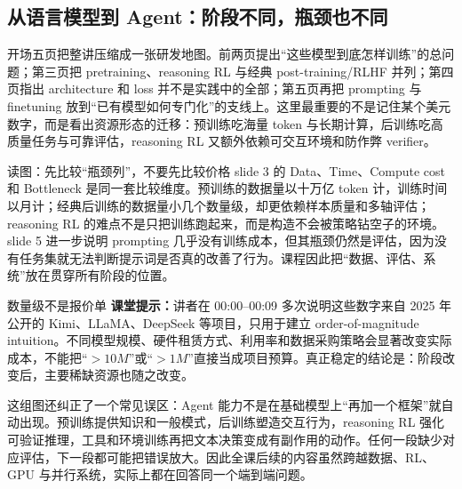 \subsection{从语言模型到 Agent：阶段不同，瓶颈也不同}

开场五页把整讲压缩成一张研发地图。前两页提出“这些模型到底怎样训练”的总问题；第三页把 pretraining、reasoning RL 与经典 post-training/RLHF 并列；第四页指出 architecture 和 loss 并不是实践中的全部；第五页再把 prompting 与 finetuning 放到“已有模型如何专门化”的支线上。这里最重要的不是记住某个美元数字，而是看出资源形态的迁移：预训练吃海量 token 与长期计算，后训练吃高质量任务与可靠评估，reasoning RL 又额外依赖可交互环境和防作弊 verifier。


\begin{knowledgebox}{读图：先比较“瓶颈列”，不要先比较价格}
slide 3 的 Data、Time、Compute cost 和 Bottleneck 是同一套比较维度。预训练的数据量以十万亿 token 计，训练时间以月计；经典后训练的数据量小几个数量级，却更依赖样本质量和多轴评估；reasoning RL 的难点不是只把训练跑起来，而是构造不会被策略钻空子的环境。slide 5 进一步说明 prompting 几乎没有训练成本，但其瓶颈仍然是评估，因为没有任务集就无法判断提示词是否真的改善了行为。课程因此把“数据、评估、系统”放在贯穿所有阶段的位置。
\end{knowledgebox}

\begin{warningbox}{数量级不是报价单}
\textbf{课堂提示：}讲者在 00:00--00:09 多次说明这些数字来自 2025 年公开的 Kimi、LLaMA、DeepSeek 等项目，只用于建立 order-of-magnitude intuition。不同模型规模、硬件租赁方式、利用率和数据采购策略会显著改变实际成本，不能把“$>10M$”或“$>1M$”直接当成项目预算。真正稳定的结论是：阶段改变后，主要稀缺资源也随之改变。
\end{warningbox}

这组图还纠正了一个常见误区：Agent 能力不是在基础模型上“再加一个框架”就自动出现。预训练提供知识和一般模式，后训练塑造交互行为，reasoning RL 强化可验证推理，工具和环境训练再把文本决策变成有副作用的动作。任何一段缺少对应评估，下一段都可能把错误放大。因此全课后续的内容虽然跨越数据、RL、GPU 与并行系统，实际上都在回答同一个端到端问题。

